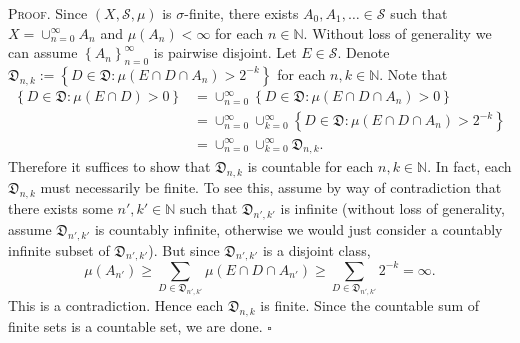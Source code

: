 \documentclass[12pt]{article}
\newcounter{ProofCounter}
\newenvironment{Proof}{\stepcounter{ProofCounter}\textsc{Proof.}}{\hfill$\square$}
\begin{document}
\begin{Proof}
Since $(X, \mathcal{S}, \mu)$ is $\sigma$-finite, there exists $A_{0}, A_{1}, \hdots \in \mathcal{S}$ such that $X = \cup_{n=0}^{\infty}A_{n}$ and
$\mu(A_{n}) < \infty$ for each $n \in \mathbb{N}$. Without loss of generality we can assume $\left\{ A_{n} \right\}_{n=0}^{\infty}$ is pairwise
disjoint. Let $E \in \mathcal{S}$. Denote $\mathfrak{D}_{n,k} := \left\{ D \in \mathfrak{D} : \mu(E\cap D\cap A_{n}) > 2^{-k} \right\}$ for each $n,k
\in \mathbb{N}$. Note that 
\begin{align*}
\left\{ D \in \mathfrak{D} : \mu(E \cap D) > 0 \right\} & = \cup_{n=0}^{\infty}\left\{ D \in \mathfrak{D} : \mu(E\cap D\cap A_{n}) > 0 \right\} \\
& = \cup_{n=0}^{\infty}\cup_{k=0}^{\infty}\left\{ D \in \mathfrak{D} : \mu(E\cap D\cap A_{n}) > 2^{-k} \right\} \\
& = \cup_{n=0}^{\infty}\cup_{k=0}^{\infty}\mathfrak{D}_{n,k}.
\end{align*}
Therefore it suffices to show that $\mathfrak{D}_{n,k}$ is countable for each $n,k \in \mathbb{N}$. In fact, each $\mathfrak{D}_{n,k}$ must
necessarily be finite. To see this, assume by way of contradiction that there exists some $n', k' \in \mathbb{N}$ such that $\mathfrak{D}_{n',k'}$ is
infinite (without loss of generality, assume $\mathfrak{D}_{n',k'}$ is countably infinite, otherwise we would just consider a countably infinite
subset of $\mathfrak{D}_{n',k'}$). But since $\mathfrak{D}_{n',k'}$ is a disjoint class, 
\[ \mu(A_{n'}) \geq \sum_{D\in \mathfrak{D}_{n',k'}}\mu(E\cap D\cap A_{n'}) \geq \sum_{D\in\mathfrak{D}_{n',k'}}2^{-k} = \infty. \]
This is a contradiction. Hence each $\mathfrak{D}_{n,k}$ is finite. Since the countable sum of finite sets is a countable set, we are done.
\end{Proof}
\end{document}
